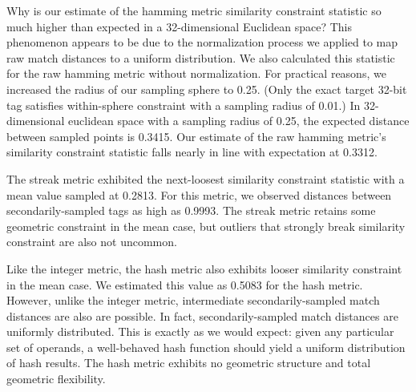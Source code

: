 Why is our estimate of the hamming metric similarity constraint statistic so much higher than expected in a 32-dimensional Euclidean space?
This phenomenon appears to be due to the normalization process we applied to map raw match distances to a uniform distribution.
We also calculated this statistic for the raw hamming metric without normalization.
For practical reasons, we increased the radius of our sampling sphere to 0.25.
(Only the exact target 32-bit tag satisfies within-sphere constraint with a sampling radius of 0.01.)
In 32-dimensional euclidean space with a sampling radius of 0.25, the expected distance between sampled points is 0.3415.
Our estimate of the raw hamming metric's similarity constraint statistic falls nearly in line with expectation at 0.3312.

The streak metric exhibited the next-loosest similarity constraint statistic with a mean value sampled at 0.2813.
For this metric, we observed distances between secondarily-sampled tags as high as 0.9993.
The streak metric retains some geometric constraint in the mean case, but outliers that strongly break similarity constraint are also not uncommon.

Like the integer metric, the hash metric also exhibits looser similarity constraint in the mean case.
We estimated this value as 0.5083 for the hash metric.
However, unlike the integer metric, intermediate secondarily-sampled match distances are also are possible.
In fact, secondarily-sampled match distances are uniformly distributed.
This is exactly as we would expect:
given any particular set of operands, a well-behaved hash function should yield a uniform distribution of hash results.
The hash metric exhibits no geometric structure and total geometric flexibility.
